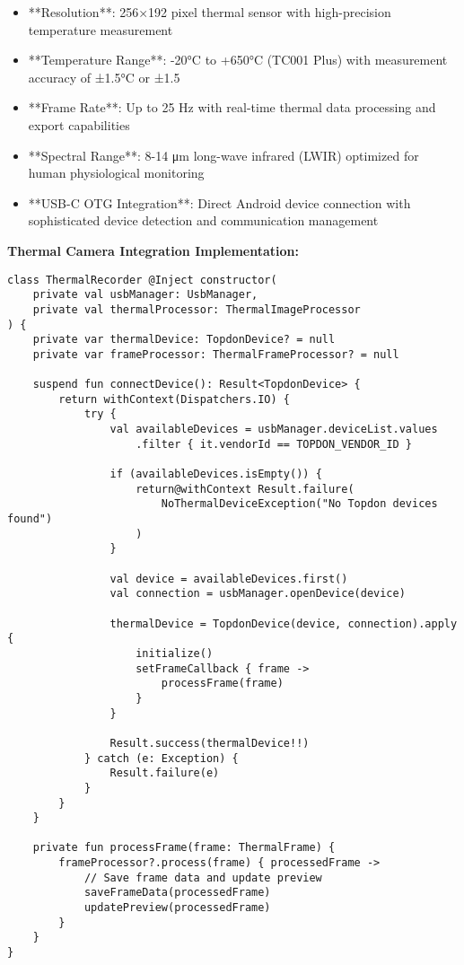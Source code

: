 \documentclass[12pt,a4paper]{article}
\begin{document}
\begin{itemize}
\item **Resolution**: 256×192 pixel thermal sensor with high-precision temperature measurement
\item **Temperature Range**: -20°C to +650°C (TC001 Plus) with measurement accuracy of ±1.5°C or ±1.5%
\item **Frame Rate**: Up to 25 Hz with real-time thermal data processing and export capabilities
\item **Spectral Range**: 8-14 μm long-wave infrared (LWIR) optimized for human physiological monitoring
\item **USB-C OTG Integration**: Direct Android device connection with sophisticated device detection and communication
  management

\end{itemize}
\textbf{Thermal Camera Integration Implementation:}

\begin{verbatim}
class ThermalRecorder @Inject constructor(
    private val usbManager: UsbManager,
    private val thermalProcessor: ThermalImageProcessor
) {
    private var thermalDevice: TopdonDevice? = null
    private var frameProcessor: ThermalFrameProcessor? = null
    
    suspend fun connectDevice(): Result<TopdonDevice> {
        return withContext(Dispatchers.IO) {
            try {
                val availableDevices = usbManager.deviceList.values
                    .filter { it.vendorId == TOPDON_VENDOR_ID }
                
                if (availableDevices.isEmpty()) {
                    return@withContext Result.failure(
                        NoThermalDeviceException("No Topdon devices found")
                    )
                }
                
                val device = availableDevices.first()
                val connection = usbManager.openDevice(device)
                
                thermalDevice = TopdonDevice(device, connection).apply {
                    initialize()
                    setFrameCallback { frame ->
                        processFrame(frame)
                    }
                }
                
                Result.success(thermalDevice!!)
            } catch (e: Exception) {
                Result.failure(e)
            }
        }
    }
    
    private fun processFrame(frame: ThermalFrame) {
        frameProcessor?.process(frame) { processedFrame ->
            // Save frame data and update preview
            saveFrameData(processedFrame)
            updatePreview(processedFrame)
        }
    }
}
\end{verbatim}
\end{document}
